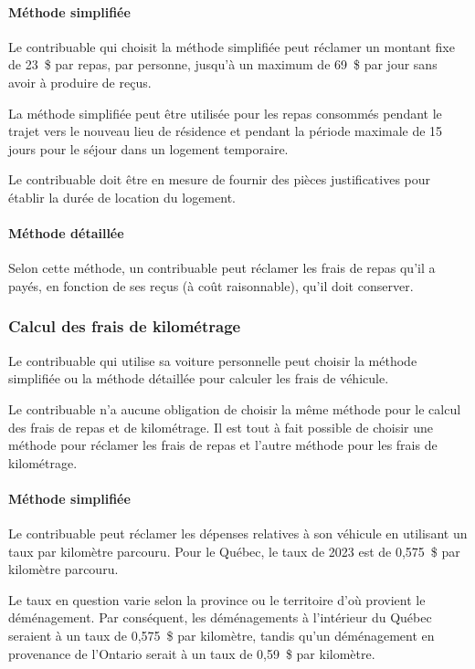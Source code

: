 \paragraph{Méthode simplifiée}
Le contribuable qui choisit la méthode simplifiée peut réclamer un montant fixe de 23~\$ par repas, par personne, jusqu'à un maximum de 69~\$ par jour sans avoir à produire de reçus. 

La méthode simplifiée peut être utilisée pour les repas consommés pendant le trajet vers le nouveau lieu de résidence et pendant la période maximale de 15 jours pour le séjour dans un logement temporaire. 

Le contribuable doit être en mesure de fournir des pièces justificatives pour établir la durée de location du logement.

\paragraph{Méthode détaillée}
Selon cette méthode, un contribuable peut réclamer les frais de repas qu'il a payés, en fonction de ses reçus (à coût raisonnable), qu'il doit conserver.

\subsubsection{Calcul des frais de kilométrage}
Le contribuable qui utilise sa voiture personnelle peut choisir la méthode simplifiée ou la méthode détaillée pour calculer les frais de véhicule.

\begin{note}
	Le contribuable n'a aucune obligation de choisir la même méthode pour le calcul des frais de repas et de kilométrage. Il est tout à fait possible de choisir une méthode pour réclamer les frais de repas et l'autre méthode pour les frais de kilométrage.
\end{note}

\paragraph{Méthode simplifiée}
Le contribuable peut réclamer les dépenses relatives à son véhicule en utilisant un taux par kilomètre parcouru. Pour le Québec, le taux de 2023 est de 0,575~\$ par kilomètre parcouru.

Le taux en question varie selon la province ou le territoire d'où provient le déménagement. Par conséquent, les déménagements à l'intérieur du Québec seraient à un taux de 0,575~\$ par kilomètre, tandis qu'un déménagement en provenance de l'Ontario serait à un taux de 0,59~\$ par kilomètre.

